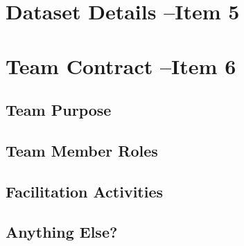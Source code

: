 \documentclass[titlepage]{article}
\begin{document}
\section{Dataset Details --Item 5}

\section{Team Contract --Item 6}

\subsection{Team Purpose}

\subsection{Team Member Roles}

\subsection{Facilitation Activities}

\subsection{Anything Else?}
\end{document}
